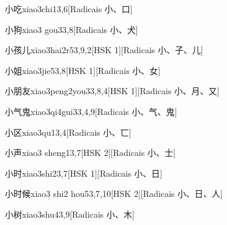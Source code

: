 \begin{entry}{小吃}{xiao3chi1}{3,6}[Radicais ⼩、⼝]
\end{entry}

\begin{entry}{小狗}{xiao3 gou3}{3,8}[Radicais ⼩、⽝]
\end{entry}

\begin{entry}{小孩儿}{xiao3hai2r5}{3,9,2}[HSK 1][Radicais ⼩、⼦、⼉]
\end{entry}

\begin{entry}{小姐}{xiao3jie5}{3,8}[HSK 1][Radicais ⼩、⼥]
\end{entry}

\begin{entry}{小朋友}{xiao3peng2you3}{3,8,4}[HSK 1][Radicais ⼩、⽉、⼜]
\end{entry}

\begin{entry}{小气鬼}{xiao3qi4gui3}{3,4,9}[Radicais ⼩、⽓、⿁]
\end{entry}

\begin{entry}{小区}{xiao3qu1}{3,4}[Radicais ⼩、⼖]
\end{entry}

\begin{entry}{小声}{xiao3 sheng1}{3,7}[HSK 2][Radicais ⼩、⼠]
\end{entry}

\begin{entry}{小时}{xiao3shi2}{3,7}[HSK 1][Radicais ⼩、⽇]
\end{entry}

\begin{entry}{小时候}{xiao3 shi2 hou5}{3,7,10}[HSK 2][Radicais ⼩、⽇、⼈]
\end{entry}

\begin{entry}{小树}{xiao3shu4}{3,9}[Radicais ⼩、⽊]
\end{entry}

